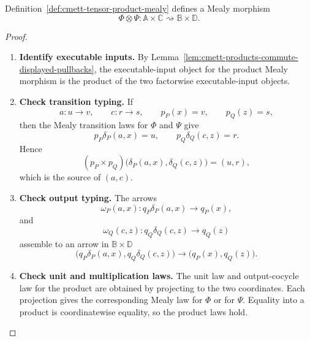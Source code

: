 \begin{lemma}
\label{lem:cmett-tensor-products-mealy}
    Definition~\ref{def:cmett-tensor-product-mealy} defines a Mealy morphism
    \[
        \Phi\otimes\Psi:
        \mathbb A\times\mathbb C
        \rightsquigarrow\mathbb B\times\mathbb D.
    \]
\end{lemma}

\begin{proof}
    \leavevmode
    \begin{enumerate}
        \item \textbf{Identify executable inputs.}
        By Lemma~\ref{lem:cmett-products-commute-displayed-pullbacks}, the
        executable-input object for the product Mealy morphism is the product
        of the two factorwise executable-input objects.

        \item \textbf{Check transition typing.}
        If
        \[
            a:u\to v,
            \qquad
            c:r\to s,
            \qquad
            p_P(x)=v,
            \qquad
            p_Q(z)=s,
        \]
        then the Mealy transition laws for \(\Phi\) and \(\Psi\) give
        \[
            p_P\delta_P(a,x)=u,
            \qquad
            p_Q\delta_Q(c,z)=r.
        \]
        Hence
        \[
            (p_P\times p_Q)
            \bigl(\delta_P(a,x),\delta_Q(c,z)\bigr)
            =
            (u,r),
        \]
        which is the source of \((a,c)\).

        \item \textbf{Check output typing.}
        The arrows
        \[
            \omega_P(a,x):q_P\delta_P(a,x)\to q_P(x),
        \]
        and
        \[
            \omega_Q(c,z):q_Q\delta_Q(c,z)\to q_Q(z)
        \]
        assemble to an arrow in \(\mathbb B\times\mathbb D\)
        \[
            \bigl(q_P\delta_P(a,x),q_Q\delta_Q(c,z)\bigr)
            \longrightarrow
            \bigl(q_P(x),q_Q(z)\bigr).
        \]

        \item \textbf{Check unit and multiplication laws.}
        The unit law and output-cocycle law for the product are obtained by
        projecting to the two coordinates. Each projection gives the
        corresponding Mealy law for \(\Phi\) or for \(\Psi\). Equality into a
        product is coordinatewise equality, so the product laws hold.
    \end{enumerate}
\end{proof}

